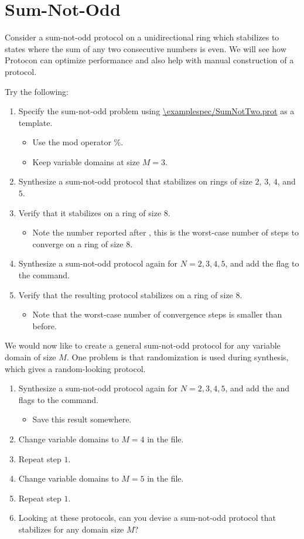 \section{Sum-Not-Odd}

Consider a sum-not-odd protocol on a unidirectional ring which stabilizes to states where the sum of any two consecutive numbers is even.
We will see how Protocon can optimize performance and also help with manual construction of a protocol.

Try the following:
\begin{enumerate}
\item Specify the sum-not-odd problem using \url{\examplespec/SumNotTwo.prot} as a template.
 \begin{itemize}
 \item Use the mod operator \%.
 \item Keep variable domains at size $M=3$.
 \end{itemize}
\item Synthesize a sum-not-odd protocol that stabilizes on rings of size $2$, $3$, $4$, and $5$.
\item Verify that it stabilizes on a ring of size $8$.
 \begin{itemize}
 \item Note the number reported after , this is the worst-case number of steps to converge on a ring of size $8$.
 \end{itemize}
\item Synthesize a sum-not-odd protocol again for $N=2,3,4,5$, and add the  flag to the command.
\item Verify that the resulting protocol stabilizes on a ring of size $8$.
 \begin{itemize}
 \item Note that the worst-case number of convergence steps is smaller than before.
 \end{itemize}
\end{enumerate}

We would now like to create a general sum-not-odd protocol for any variable domain of size $M$.
One problem is that randomization is used during synthesis, which gives a random-looking protocol.
\begin{enumerate}
\item Synthesize a sum-not-odd protocol again for $N=2,3,4,5$, and add the  and  flags to the command.
 \begin{itemize}
 \item Save this result somewhere.
 \end{itemize}
\item Change variable domains to $M=4$ in the file.
\item Repeat step $1$.
\item Change variable domains to $M=5$ in the file.
\item Repeat step $1$.
\item Looking at these protocols, can you devise a sum-not-odd protocol that stabilizes for any domain size $M$?
\end{enumerate}


